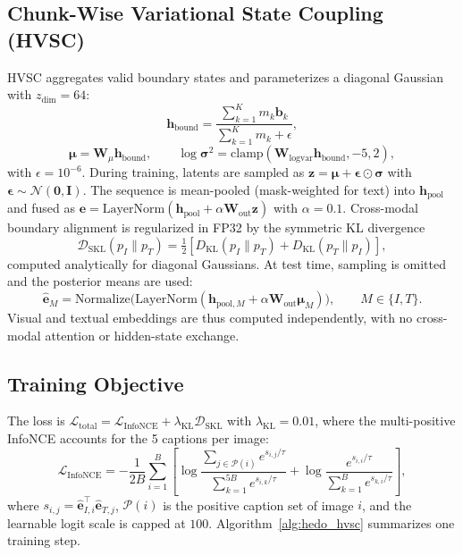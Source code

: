 \documentclass[runningheads,a4paper]{llncs}
\begin{document}
\subsection{Chunk-Wise Variational State Coupling (HVSC)}
HVSC aggregates valid boundary states and parameterizes a diagonal Gaussian with $z_{\text{dim}} = 64$:
\begin{equation}
\mathbf{h}_{\text{bound}} = \frac{\sum_{k=1}^K m_k \mathbf{b}_k}{\sum_{k=1}^K m_k + \epsilon}, \label{eq:hbound}
\end{equation}
\begin{equation}
\boldsymbol{\mu} = \mathbf{W}_\mu \mathbf{h}_{\text{bound}}, \qquad \log \boldsymbol{\sigma}^2 = \text{clamp}(\mathbf{W}_{\text{logvar}} \mathbf{h}_{\text{bound}}, -5, 2), \label{eq:latent}
\end{equation}
with $\epsilon = 10^{-6}$. During training, latents are sampled as $\mathbf{z} = \boldsymbol{\mu} + \boldsymbol{\epsilon} \odot \boldsymbol{\sigma}$ with $\boldsymbol{\epsilon} \sim \mathcal{N}(\mathbf{0}, \mathbf{I})$. The sequence is mean-pooled (mask-weighted for text) into $\mathbf{h}_{\text{pool}}$ and fused as $\mathbf{e} = \text{LayerNorm}(\mathbf{h}_{\text{pool}} + \alpha \mathbf{W}_{\text{out}} \mathbf{z})$ with $\alpha = 0.1$. Cross-modal boundary alignment is regularized in FP32 by the symmetric KL divergence
\begin{equation}
\mathcal{D}_{\text{SKL}}(p_I \parallel p_T) = \tfrac{1}{2} \left[ D_{\text{KL}}(p_I \parallel p_T) + D_{\text{KL}}(p_T \parallel p_I) \right], \label{eq:skl}
\end{equation}
computed analytically for diagonal Gaussians. At test time, sampling is omitted and the posterior means are used:
\begin{equation}
\hat{\mathbf{e}}_M = \text{Normalize}\big(\text{LayerNorm}(\mathbf{h}_{\text{pool}, M} + \alpha \mathbf{W}_{\text{out}} \boldsymbol{\mu}_M)\big), \qquad M \in \{I, T\}.
\end{equation}
Visual and textual embeddings are thus computed independently, with no cross-modal attention or hidden-state exchange.

\subsection{Training Objective}
The loss is $\mathcal{L}_{\text{total}} = \mathcal{L}_{\text{InfoNCE}} + \lambda_{\text{KL}} \mathcal{D}_{\text{SKL}}$ with $\lambda_{\text{KL}} = 0.01$, where the multi-positive InfoNCE accounts for the 5 captions per image:
\begin{equation}
\mathcal{L}_{\text{InfoNCE}} = -\frac{1}{2B} \sum_{i=1}^B \left[ \log \frac{\sum_{j \in \mathcal{P}(i)} e^{s_{i,j} / \tau}}{\sum_{k=1}^{5B} e^{s_{i,k} / \tau}} + \log \frac{e^{s_{i,i} / \tau}}{\sum_{k=1}^B e^{s_{k,i} / \tau}} \right], \label{eq:infonce}
\end{equation}
where $s_{i,j} = \hat{\mathbf{e}}_{I, i}^\top \hat{\mathbf{e}}_{T, j}$, $\mathcal{P}(i)$ is the positive caption set of image $i$, and the learnable logit scale is capped at $100$. Algorithm~\ref{alg:hedo_hvsc} summarizes one training step.
\end{document}
